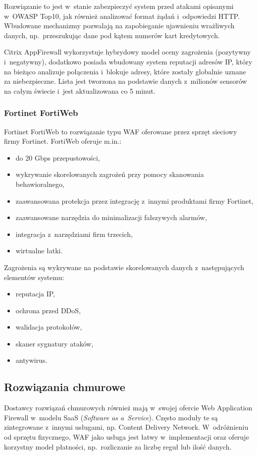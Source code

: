 \documentclass[12pt,a4paper,polish,thesis]{dcsbook}
\begin{document}
Rozwiązanie to jest w~stanie zabezpieczyć system przed atakami opisanymi w~OWASP Top10, jak również analizować format żądań i~odpowiedzi HTTP. Wbudowane mechanizmy pozwalają na zapobieganie ujawnieniu wrażliwych danych, np.~przeszukując dane pod kątem numerów kart kredytowych.

Citrix AppFirewall wykorzystuje hybrydowy model oceny zagrożenia (pozytywny i~negatywny), dodatkowo posiada wbudowany system reputacji adresów IP, który na bieżąco analizuje połączenia i~blokuje adresy, które zostały globalnie uznane za niebezpieczne. Lista jest tworzona na podstawie danych z~milionów sensorów na całym świecie i~jest aktualizowana co 5 minut.

\subsubsection{Fortinet FortiWeb}
Fortinet FortiWeb \cite{fortiweb} to rozwiązanie typu WAF oferowane przez sprzęt sieciowy firmy Fortinet. FortiWeb oferuje m.in.:
\begin{itemize}
\item do 20 Gbps przepustowości,
\item wykrywanie skorelowanych zagrożeń przy pomocy skanowania behawioralnego,
\item zaawansowana protekcja przez integrację z~innymi produktami firmy Fortinet,
\item zaawansowane narzędzia do minimalizacji fałszywych alarmów,
\item integracja z~narzędziami firm trzecich,
\item wirtualne łatki.
\end{itemize}

Zagrożenia są wykrywane na podstawie skorelowanych danych z~następujących elementów systemu:
\begin{itemize}
\item reputacja IP,
\item ochrona przed DDoS,
\item walidacja protokołów,
\item skaner sygnatury ataków,
\item antywirus.
\end{itemize}

\subsection{Rozwiązania chmurowe}
Dostawcy rozwiązań chmurowych również mają w~swojej ofercie Web Application Firewall w~modelu SaaS (\textit{Software as a~Service}). Często moduły te są zintegrowane z~innymi usługami, np. Content Delivery Network. W~odróżnieniu od sprzętu fizycznego, WAF jako usługa jest łatwy w~implementacji oraz oferuje korzystny model płatności, np.~rozliczanie za liczbę reguł lub ilość danych.
\end{document}
